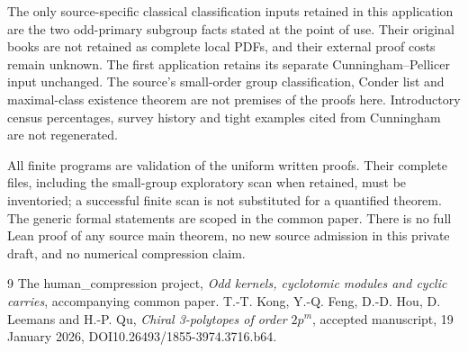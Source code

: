 The only source-specific classical classification inputs retained in
this application are the two odd-primary subgroup facts stated at
the point of use. Their original books are not retained as complete
local PDFs, and their external proof costs remain unknown.
The first application retains its separate Cunningham--Pellicer
input unchanged. The source's small-order group classification,
Conder list and maximal-class existence theorem are not premises
of the proofs here. Introductory census percentages, survey history
and tight examples cited from Cunningham are not regenerated.

All finite programs are validation of the uniform written proofs.
Their complete files, including the small-group exploratory scan
when retained, must be inventoried; a successful finite scan is not
substituted for a quantified theorem. The generic formal statements
are scoped in the common paper. There is no full Lean proof of any
source main theorem, no new source admission in this private draft,
and no numerical compression claim.
\begin{thebibliography}{9}
 The human\_compression project,
\emph{Odd kernels, cyclotomic modules and cyclic carries}, accompanying common paper.
 T.-T. Kong, Y.-Q. Feng, D.-D. Hou, D. Leemans and H.-P. Qu,
\emph{Chiral 3-polytopes of order $2p^m$}, accepted manuscript,
19 January 2026, DOI10.26493/1855-3974.3716.b64.
\end{thebibliography}
